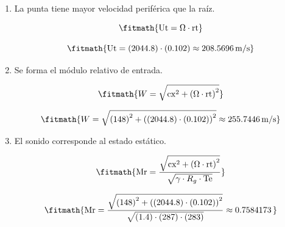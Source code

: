 \begin{enumerate}

\item La punta tiene mayor velocidad periférica que la raíz.

\[\fitmath{\mathrm{Ut}=\Omega\cdot \mathrm{rt}}\]

\[\fitmath{\mathrm{Ut}=(2044.8)\cdot (0.102)\approx 208.5696\,\mathrm{m/s}}\]

\item Se forma el módulo relativo de entrada.

\[\fitmath{W=\sqrt{{\mathrm{cx}}^{2}+{\left(\Omega\cdot \mathrm{rt}\right)}^{2}}}\]

\[\fitmath{W=\sqrt{{(148)}^{2}+{\left((2044.8)\cdot (0.102)\right)}^{2}}\approx 255.7446\,\mathrm{m/s}}\]

\item El sonido corresponde al estado estático.

\[\fitmath{\mathrm{Mr}=\frac{\sqrt{{\mathrm{cx}}^{2}+{\left(\Omega\cdot \mathrm{rt}\right)}^{2}}}{\sqrt{\gamma\cdot R_g\cdot \mathrm{Te}}}}\]

\[\fitmath{\mathrm{Mr}=\frac{\sqrt{{(148)}^{2}+{\left((2044.8)\cdot (0.102)\right)}^{2}}}{\sqrt{(1.4)\cdot (287)\cdot (283)}}\approx 0.7584173\,}\]

\end{enumerate}
